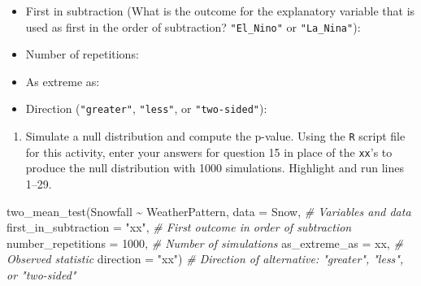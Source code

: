 \documentclass[
]{report}
\newenvironment{Shaded}{\begin{snugshade}}{\end{snugshade}}
\newcommand{\AttributeTok}[1]{\textcolor[rgb]{0.77,0.63,0.00}{#1}}
\newcommand{\CommentTok}[1]{\textcolor[rgb]{0.56,0.35,0.01}{\textit{#1}}}
\newcommand{\DecValTok}[1]{\textcolor[rgb]{0.00,0.00,0.81}{#1}}
\newcommand{\FunctionTok}[1]{\textcolor[rgb]{0.00,0.00,0.00}{#1}}
\newcommand{\NormalTok}[1]{#1}
\newcommand{\SpecialCharTok}[1]{\textcolor[rgb]{0.00,0.00,0.00}{#1}}
\newcommand{\StringTok}[1]{\textcolor[rgb]{0.31,0.60,0.02}{#1}}
\providecommand{\tightlist}{%
  \setlength{\itemsep}{0pt}\setlength{\parskip}{0pt}}
\begin{document}
\vspace{.2in}

\begin{itemize}
\tightlist
\item
  First in subtraction (What is the outcome for the explanatory variable that is used as first in the order of subtraction? \texttt{"El\_Nino"} or \texttt{"La\_Nina"}):
\end{itemize}

\vspace{.2in}

\begin{itemize}
\tightlist
\item
  Number of repetitions:
\end{itemize}

\vspace{.2in}

\begin{itemize}
\tightlist
\item
  As extreme as:
\end{itemize}

\vspace{.2in}

\begin{itemize}
\tightlist
\item
  Direction (\texttt{"greater"}, \texttt{"less"}, or \texttt{"two-sided"}):
\end{itemize}

\vspace{.2in}

\begin{enumerate}
\def\labelenumi{\arabic{enumi}.}
\setcounter{enumi}{15}
\tightlist
\item
  Simulate a null distribution and compute the p-value. Using the \texttt{R} script file for this activity, enter your answers for question 15 in place of the \texttt{xx}'s to produce the null distribution with 1000 simulations. Highlight and run lines 1--29.
\end{enumerate}

\begin{Shaded}
\begin{Highlighting}[]
\FunctionTok{two\_mean\_test}\NormalTok{(Snowfall }\SpecialCharTok{\textasciitilde{}}\NormalTok{ WeatherPattern, }\AttributeTok{data =}\NormalTok{ Snow,  }\CommentTok{\# Variables and data}
         \AttributeTok{first\_in\_subtraction =} \StringTok{"xx"}\NormalTok{, }\CommentTok{\# First outcome in order of subtraction}
         \AttributeTok{number\_repetitions =} \DecValTok{1000}\NormalTok{,  }\CommentTok{\# Number of simulations}
         \AttributeTok{as\_extreme\_as =}\NormalTok{ xx,  }\CommentTok{\# Observed statistic}
         \AttributeTok{direction =} \StringTok{"xx"}\NormalTok{)  }\CommentTok{\# Direction of alternative: "greater", "less", or "two{-}sided"}
\end{Highlighting}
\end{Shaded}
\end{document}
